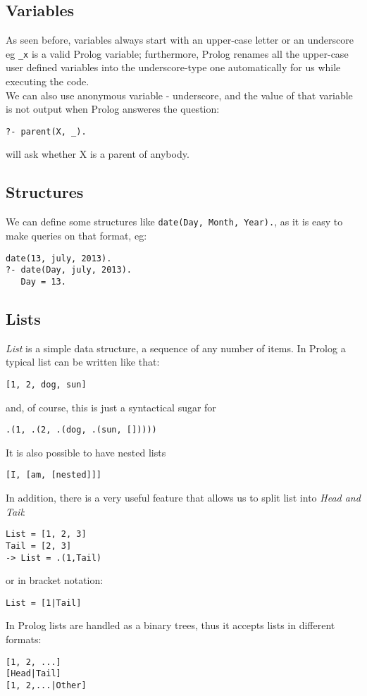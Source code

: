 \documentclass[11pt]{article}
\begin{document}
\subsection{Variables}
As seen before, variables always start with an upper-case letter or an underscore eg \texttt{\_x} is a valid Prolog variable; furthermore, Prolog renames all the upper-case user defined variables into the underscore-type one automatically for us while executing the code.\\
We can also use anonymous variable - underscore, and the value of that variable is not output when Prolog answeres the question:
\begin{lstlisting}
?- parent(X, _).
\end{lstlisting}
will ask whether X is a parent of anybody.

\subsection{Structures}
We can define some structures like \texttt{date(Day, Month, Year).}, as it is easy to make queries on that format, eg:
\begin{lstlisting}
date(13, july, 2013).
?- date(Day, july, 2013).
   Day = 13.
\end{lstlisting}

\subsection{Lists}
\emph{List} is a simple data structure, a sequence of any number of items. In Prolog a typical list can be written like that: 
\begin{lstlisting}
[1, 2, dog, sun]
\end{lstlisting}
and, of course, this is just a syntactical sugar for 
\begin{lstlisting}
.(1, .(2, .(dog, .(sun, []))))
\end{lstlisting} 
It is also possible to have nested lists
\begin{lstlisting}
[I, [am, [nested]]]
\end{lstlisting}
In addition, there is a very useful feature that allows us to split list into \emph{Head and Tail}:
\begin{lstlisting}
List = [1, 2, 3]
Tail = [2, 3]
-> List = .(1,Tail)
\end{lstlisting}
or in bracket notation:
\begin{lstlisting}
List = [1|Tail]
\end{lstlisting}
In Prolog lists are handled as a binary trees, thus it accepts lists in different formats:
\begin{lstlisting}
[1, 2, ...]
[Head|Tail]
[1, 2,...|Other]
\end{lstlisting}
\end{document}

